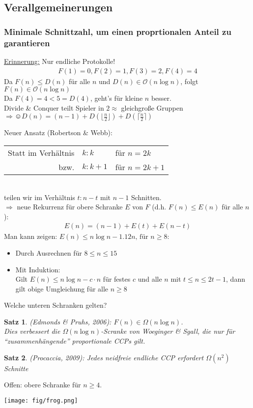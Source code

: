 \documentclass[a4paper,10pt]{scrartcl}
\newtheorem*{satz*}{Satz}
\begin{document}
\subsection{Verallgemeinerungen}
\subsubsection{Minimale Schnittzahl, um einen proprtionalen Anteil zu garantieren}
\underline{Erinnerung:} Nur endliche Protokolle!
\begin{align*}
 F(1)=0, F(2)=1, F(3)=2, F(4)=4
\end{align*}
Da $F(n)\leq D(n)$ für alle $n$ und $D(n)\in\mathcal{O}(n\log n)$, folgt $F(n)\in\mathcal{O}(n\log n)$\\
Da $F(4)=4<5=D(4)$, geht's für kleine $n$ besser.\\
Divide \& Conquer teilt Spieler in $2\approx$ gleichgroße Gruppen\\
$\Rightarrow \smiley D(n)=(n-1)+D(\lfloor\frac{n}{2}\rfloor)+D(\lceil\frac{n}{2}\rceil)$

Neuer Ansatz (Robertson \& Webb):\\
\begin{tabular}{rll}
 Statt im Verhältnis & $k:k$&für $n=2k$\\
 bzw. &$k:k+1$& für $n=2k+1$
\end{tabular}\\
teilen wir im Verhältnis $t:n-t$ mit $n-1$ Schnitten.\\
$\Rightarrow$ neue Rekurrenz für obere Schranke $E$ von $F$ (d.h. $F(n)\leq E(n)$ für alle $n$):
\begin{align*}
 E(n)=(n-1)+E(t)+E(n-t)
\end{align*}
Man kann zeigen: $E(n)\leq n\log n-1.12n\text{, für }n\geq 8$:
\begin{itemize}
 \item Durch Ausrechnen für $8\leq n\leq15$
 \item Mit Induktion:\\ Gilt $E(n)\leq n\log n-c\cdot n$ für festes $c$ und alle $n$ mit $t\leq n\leq2t-1$, dann gilt obige Umgleichung
       für alle $n\geq8$
\end{itemize}
Welche unteren Schranken gelten?
\begin{satz*}
 (Edmonds \& Pruhs, 2006): $F(n)\in\Omega(n\log n)$.\\
Dies verbessert die $\Omega(n\log n)$-Scranke von Woeginger \& Sgall, die nur für ``zusammenhängende'' proportionale CCPs gilt.
\end{satz*}
\begin{satz*}
 (Procaccia, 2009): Jedes neidfreie endliche CCP erfordert $\Omega(n^2)$ Schnitte
\end{satz*}
Offen: obere Schranke für $n\geq4$.
\begin{center}\texttt{[image: fig/frog.png]}\end{center}
\end{document}
